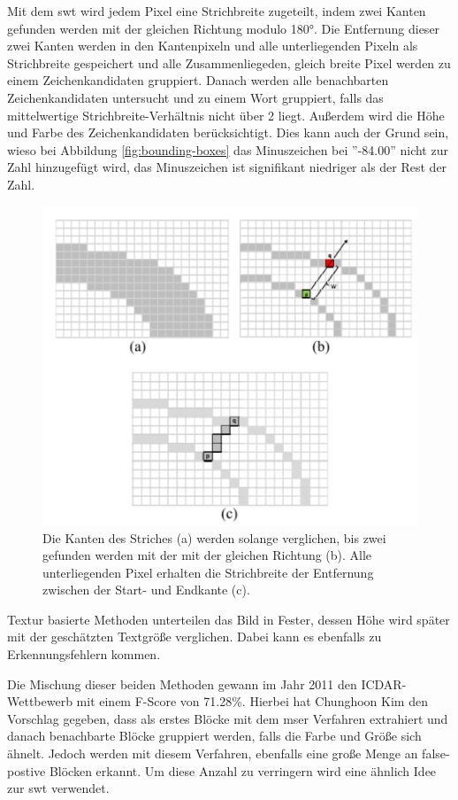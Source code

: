 Mit dem \Gls{swt} wird jedem Pixel eine Strichbreite zugeteilt, indem zwei Kanten gefunden werden mit der gleichen Richtung modulo 180°. Die Entfernung dieser zwei Kanten werden in den Kantenpixeln und alle unterliegenden Pixeln als Strichbreite gespeichert und alle Zusammenliegeden, gleich breite Pixel werden zu einem Zeichenkandidaten gruppiert. Danach werden alle benachbarten Zeichenkandidaten untersucht und zu einem Wort gruppiert, falls das mittelwertige Strichbreite-Verhältnis nicht über 2 liegt. Außerdem wird die Höhe und Farbe des Zeichenkandidaten berücksichtigt. Dies kann auch der Grund sein, wieso bei Abbildung \ref{fig:bounding-boxes} das Minuszeichen bei ''-84.00'' nicht zur Zahl hinzugefügt wird, das Minuszeichen ist signifikant niedriger als der Rest der Zahl. \cite{SWT:online}

\begin{figure}[H]
    \centering
    \includegraphics[scale=0.7]{sections/machine-learning/images/SWT.png}
    \caption{Die Kanten des Striches (a) werden solange verglichen, bis zwei gefunden werden mit der mit der gleichen Richtung (b). Alle unterliegenden Pixel erhalten die Strichbreite der Entfernung zwischen der Start- und Endkante (c).}
\end{figure}

Textur basierte Methoden unterteilen das Bild in Fester, dessen Höhe wird später mit der geschätzten Textgröße verglichen. Dabei kann es ebenfalls zu Erkennungsfehlern kommen.

Die Mischung dieser beiden Methoden gewann im Jahr 2011 den ICDAR-Wettbewerb mit einem F-Score von 71.28\%. Hierbei hat Chunghoon Kim den Vorschlag gegeben, dass als erstes Blöcke  mit dem \Gls{mser} Verfahren extrahiert und danach benachbarte Blöcke gruppiert werden, falls die Farbe und Größe sich ähnelt. Jedoch werden mit diesem Verfahren, ebenfalls eine große Menge an false-postive Blöcken erkannt. Um diese Anzahl zu verringern wird eine ähnlich Idee zur \gls{swt} verwendet. \cite{SWT:online}

